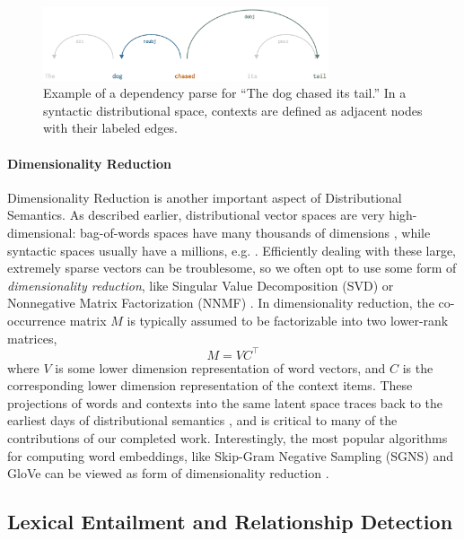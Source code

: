 \documentclass[12pt]{article}
\begin{document}
\begin{figure}
  \centering
  \includegraphics[width=0.75\textwidth]{figures/syn}
\caption{Example of a dependency parse for ``The dog chased its tail.'' In
a syntactic distributional space, contexts are defined as adjacent nodes
with their labeled edges.}
\label{fig:syn}
\end{figure}

\paragraph{Dimensionality Reduction}
Dimensionality Reduction is another important aspect of Distributional Semantics.
As described earlier, distributional vector
spaces are very high-dimensional: bag-of-words spaces have many thousands of
dimensions \cite{turney:2010:jair,mikolov:2013:iclr,pennington:2014:emnlp},
while syntactic spaces usually have a millions, e.g. .
Efficiently dealing with these large, extremely sparse vectors can be
troublesome, so we often opt to use some form of {\em dimensionality
reduction}, like Singular Value Decomposition (SVD)
\cite{deerwester:1990:jsis,landauer:1997:pr} or Nonnegative Matrix
Factorization (NNMF) \cite{lee:2000:nips}. In dimensionality reduction, the
co-occurrence matrix $M$ is typically assumed to be factorizable into two
lower-rank matrices,
\begin{equation}
  M = VC^{\top}
  \label{eqn:svd}
\end{equation}
where $V$ is some lower dimension representation of word vectors, and $C$ is
the corresponding lower dimension representation of the context items. These
projections of words and contexts into the same latent space traces back to the
earliest days of distributional semantics \cite{deerwester:1990:jsis}, and is
critical to many of the contributions of our completed work.  Interestingly,
the most popular algorithms for computing word embeddings, like Skip-Gram
Negative Sampling (SGNS) \cite{mikolov:2013:iclr} and GloVe
\cite{pennington:2014:emnlp} can be viewed as form of dimensionality reduction
\cite{levy:2014:nips,levy:2015:tacl}.

\subsection{Lexical Entailment and Relationship Detection}
\end{document}

